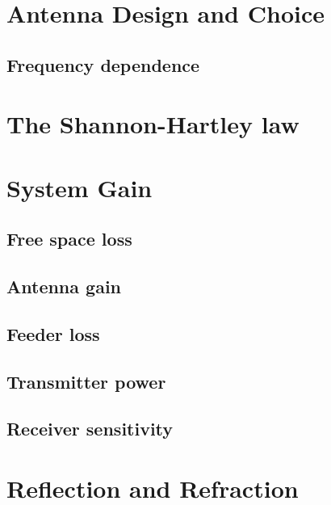 \section{Antenna Design and Choice}

\subsection{Frequency dependence}

\section{The Shannon-Hartley law}

\section{System Gain}

\subsection{Free space loss}

\subsection{Antenna gain}

\subsection{Feeder loss}

\subsection{Transmitter power}

\subsection{Receiver sensitivity}

\section{Reflection and Refraction}


